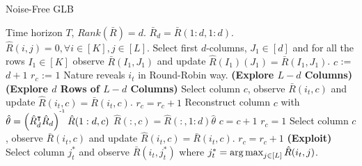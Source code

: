 \begin{algorithm}[!th]
\caption{Noise-Free GLB}
\label{alg:NFGLB}
\begin{algorithmic}[1]
 Time horizon $T$, $Rank(\bar{R}) = d$.
 $\bar{R}_d = \bar{R}(1:d,1:d)$.
 $\hat{R}(i,j) = 0, \forall i\in[K], j\in[L]$.
\State Select first $d$-columns, $J_1 \in [d]$ and for all the rows $I_1\in[K]$ observe $\bar{R}(I_1,J_1)$ and update  $\hat{R}(I_1)(J_1) = \bar{R}(I_1,J_1)$.
\State $c$ := $d+1$
\State $r_c$ := $1$
\State Nature reveals $i_t$ in Round-Robin way.
\State {} \textbf{ (Explore $L-d$ Columns)}
\State {} \textbf{(Explore $d$ Rows of  $L-d$ Columns)}
\State Select column $c$, observe $\bar{R}(i_t,c)$ and update $\hat{R}(i_t,c) = \bar{R}(i_t,c)$.
\State $r_c = r_c + 1$
\Else
\ColRec
\State Reconstruct column $c$ with $\hat{\theta} = \left(\hat{R}_d^{\intercal}\hat{R}_d\right)^{^{\text{-}1}}\hat{R}(1:d,c) $
\State $\hat{R}(:,c) =  \hat{R}(:,1:d)\hat{\theta}$
\State $c = c + 1$
\State $r_c = 1$
\EndColRec
\State Select column $c$, observe $\bar{R}(i_t,c)$ and update $\hat{R}(i_t,c)=\bar{R}(i_t,c)$.
\State $r_c = r_c + 1$
\EndIf
\Else
\State \textbf{(Exploit)} Select column $j_t^*$ and observe $\bar{R}(i_t,j_t^*)$ where $j_t^* = \mathop{\rm arg\,max}_{j\in[L]} {\hat{R}(i_t,j)}$.
\EndIf
\EndFor
\end{algorithmic}
\end{algorithm}



